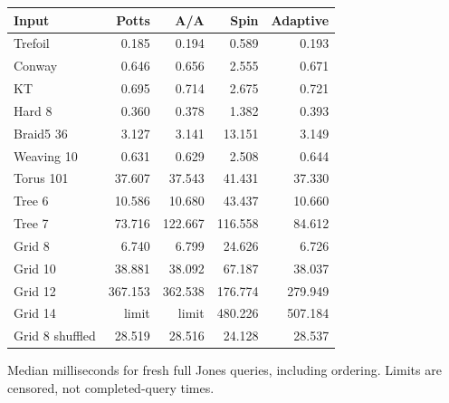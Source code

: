\begin{center}\small
\begin{tabular}{@{}lrrrr@{}}
\toprule
Input & Potts & A/A & Spin & Adaptive \\
\midrule
Trefoil & 0.185 & 0.194 & 0.589 & 0.193 \\
Conway & 0.646 & 0.656 & 2.555 & 0.671 \\
KT & 0.695 & 0.714 & 2.675 & 0.721 \\
Hard 8 & 0.360 & 0.378 & 1.382 & 0.393 \\
Braid5 36 & 3.127 & 3.141 & 13.151 & 3.149 \\
Weaving 10 & 0.631 & 0.629 & 2.508 & 0.644 \\
Torus 101 & 37.607 & 37.543 & 41.431 & 37.330 \\
Tree 6 & 10.586 & 10.680 & 43.437 & 10.660 \\
Tree 7 & 73.716 & 122.667 & 116.558 & 84.612 \\
Grid 8 & 6.740 & 6.799 & 24.626 & 6.726 \\
Grid 10 & 38.881 & 38.092 & 67.187 & 38.037 \\
Grid 12 & 367.153 & 362.538 & 176.774 & 279.949 \\
Grid 14 & limit & limit & 480.226 & 507.184 \\
Grid 8 shuffled & 28.519 & 28.516 & 24.128 & 28.537 \\
\bottomrule
\end{tabular}
\end{center}
Median milliseconds for fresh full Jones queries, including ordering. Limits are censored, not completed-query times.
